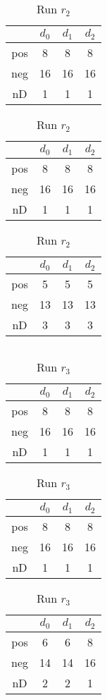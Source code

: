 \begin{table}[h]
$\quad$ %
\begin{tabular}{| c | c c c |}
 \hline
  & $d_0$ & $d_1$ & $d_2$ \\
 \hline
 pos & 8  & 8  & 8 \\
 neg & 16  & 16  & 16 \\
 nD & 1  & 1  & 1 \\\hline 
\end{tabular}
\hspace{17pt}
\begin{tabular}{| c | c c c |}
 \hline
  & $d_0$ & $d_1$ & $d_2$ \\
 \hline
 pos & 8  & 8  & 8 \\
 neg & 16  & 16  & 16 \\
 nD & 1  & 1  & 1 \\\hline 
\end{tabular}
\hspace{17pt}
\begin{tabular}{| c | c c c |}
 \hline
  & $d_0$ & $d_1$ & $d_2$ \\
 \hline
 pos & 5  & 5  & 5 \\
 neg & 13  & 13  & 13 \\
 nD & 3  & 3  & 3 \\\hline 
\end{tabular}
\caption{Run $r_2$}
\end{table}

\begin{table}[h]
$\quad$ %
\begin{tabular}{| c | c c c |}
 \hline
  & $d_0$ & $d_1$ & $d_2$ \\
 \hline
 pos & 8  & 8  & 8 \\
 neg & 16  & 16  & 16 \\
 nD & 1  & 1  & 1 \\\hline 
\end{tabular}
\hspace{13pt}
\begin{tabular}{| c | c c c |}
 \hline
  & $d_0$ & $d_1$ & $d_2$ \\
 \hline
 pos & 8  & 8  & 8 \\
 neg & 16  & 16  & 16 \\
 nD & 1  & 1  & 1 \\\hline 
\end{tabular}
\hspace{13pt}
\begin{tabular}{| c | c c c |}
 \hline
  & $d_0$ & $d_1$ & $d_2$ \\
 \hline
 pos & 6  & 6  & 8 \\
 neg & 14  & 14  & 16 \\
 nD & 2  & 2  & 1 \\\hline 
\end{tabular}
\caption{Run $r_3$}
\end{table}

